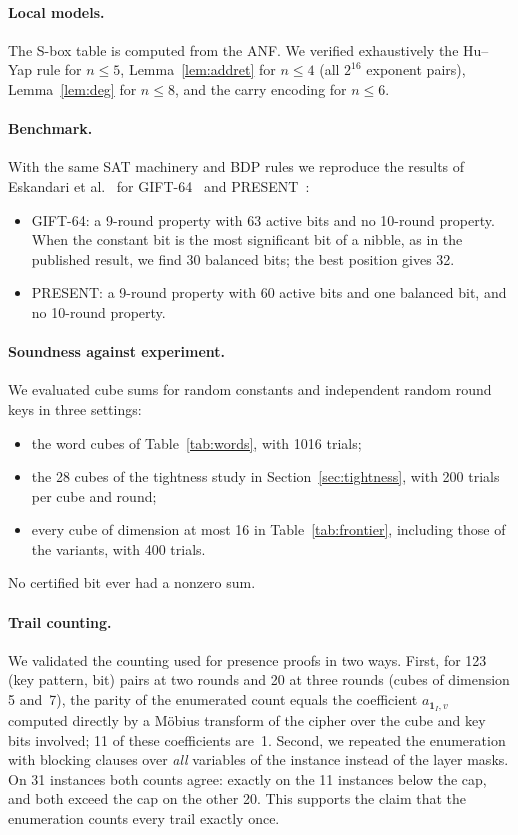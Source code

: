 \documentclass[11pt,a4paper]{article}
\theoremstyle{definition}
\theoremstyle{remark}
\begin{document}
\paragraph{Local models.} The S-box table is computed from the ANF. We verified exhaustively the Hu--Yap rule for $n\le5$, Lemma~\ref{lem:addret} for $n\le4$ (all $2^{16}$ exponent pairs), Lemma~\ref{lem:deg} for $n\le8$, and the carry encoding for $n\le6$.

\paragraph{Benchmark.} With the same SAT machinery and BDP rules we reproduce the results of Eskandari et al.~\cite{eskandari2018} for GIFT-64~\cite{gift2017} and PRESENT~\cite{present2007}:
\begin{itemize}
\item GIFT-64: a 9-round property with 63 active bits and no 10-round property. When the constant bit is the most significant bit of a nibble, as in the published result, we find 30 balanced bits; the best position gives 32.
\item PRESENT: a 9-round property with 60 active bits and one balanced bit, and no 10-round property.
\end{itemize}

\paragraph{Soundness against experiment.} We evaluated cube sums for random constants and independent random round keys in three settings:
\begin{itemize}
\item the word cubes of Table~\ref{tab:words}, with 1016 trials;
\item the 28 cubes of the tightness study in Section~\ref{sec:tightness}, with 200 trials per cube and round;
\item every cube of dimension at most 16 in Table~\ref{tab:frontier}, including those of the variants, with 400 trials.
\end{itemize}
No certified bit ever had a nonzero sum.

\paragraph{Trail counting.} We validated the counting used for presence proofs in two ways. First, for 123 (key pattern, bit) pairs at two rounds and 20 at three rounds (cubes of dimension 5 and~7), the parity of the enumerated count equals the coefficient $a_{\mathbf 1_I,v}$ computed directly by a M\"obius transform of the cipher over the cube and key bits involved; 11 of these coefficients are~1. Second, we repeated the enumeration with blocking clauses over \emph{all} variables of the instance instead of the layer masks. On 31 instances both counts agree: exactly on the 11 instances below the cap, and both exceed the cap on the other 20. This supports the claim that the enumeration counts every trail exactly once.
\end{document}
